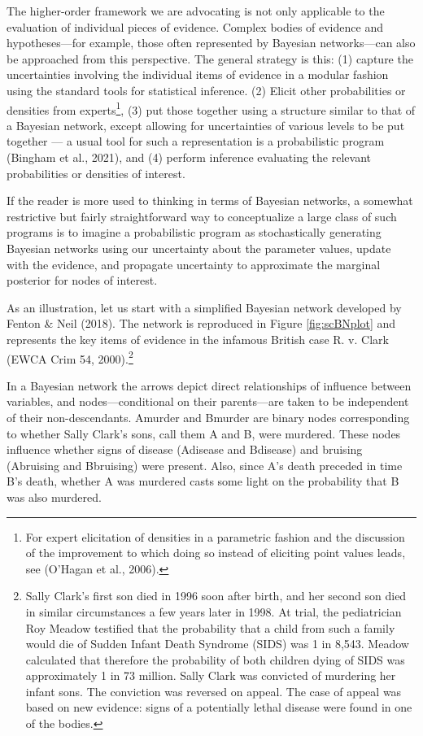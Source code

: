 \documentclass[
  10pt,
  dvipsnames,enabledeprecatedfontcommands]{scrartcl}
\begin{document}
The higher-order framework we are advocating is not only applicable to
the evaluation of individual pieces of evidence. Complex bodies of
evidence and hypotheses---for example, those often represented by
Bayesian networks---can also be approached from this perspective. The
general strategy is this: (1) capture the uncertainties involving the
individual items of evidence in a modular fashion using the standard
tools for statistical inference. (2) Elicit other probabilities or
densities from experts\footnote{For expert elicitation of densities in a
  parametric fashion and the discussion of the improvement to which
  doing so instead of eliciting point values leads, see (O'Hagan et al.,
  2006).}, (3) put those together using a structure similar to that of a
Bayesian network, except allowing for uncertainties of various levels to
be put together --- a usual tool for such a representation is a
probabilistic program (Bingham et al., 2021), and (4) perform inference
evaluating the relevant probabilities or densities of interest.

If the reader is more used to thinking in terms of Bayesian networks, a
somewhat restrictive but fairly straightforward way to conceptualize a
large class of such programs is to imagine a probabilistic program as
stochastically generating Bayesian networks using our uncertainty about
the parameter values, update with the evidence, and propagate
uncertainty to approximate the marginal posterior for nodes of interest.

As an illustration, let us start with a simplified Bayesian network
developed by Fenton \& Neil (2018). The network is reproduced in Figure
\ref{fig:scBNplot} and represents the key items of evidence in the
infamous British case R. v. Clark (EWCA Crim 54, 2000).\footnote{Sally
  Clark's first son died in 1996 soon after birth, and her second son
  died in similar circumstances a few years later in 1998. At trial, the
  pediatrician Roy Meadow testified that the probability that a child
  from such a family would die of Sudden Infant Death Syndrome (SIDS)
  was 1 in 8,543. Meadow calculated that therefore the probability of
  both children dying of SIDS was approximately 1 in 73 million. Sally
  Clark was convicted of murdering her infant sons. The conviction was
  reversed on appeal. The case of appeal was based on new evidence:
  signs of a potentially lethal disease were found in one of the bodies.}

In a Bayesian network the arrows depict direct relationships of
influence between variables, and nodes---conditional on their
parents---are taken to be independent of their non-descendants.
\textsf{Amurder} and \textsf{Bmurder} are binary nodes corresponding to
whether Sally Clark's sons, call them A and B, were murdered. These
nodes influence whether signs of disease (\textsf{Adisease} and
\textsf{Bdisease}) and bruising (\textsf{Abruising} and
\textsf{Bbruising}) were present. Also, since A's death preceded in time
B's death, whether A was murdered casts some light on the probability
that B was also murdered.
\end{document}
